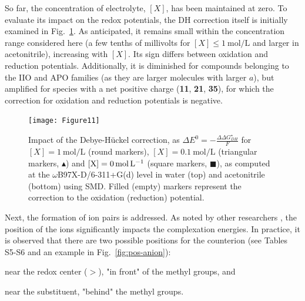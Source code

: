 \documentclass[review,preprint]{elsarticle}
\begin{document}
So far, the concentration of electrolyte, $[X]$, has been maintained at zero. To evaluate its impact on the redox potentials, the DH correction itself is initially examined in Fig.~\ref{fig:DH}. As anticipated, it remains small within the concentration range considered here (a few tenths of millivolts for $[X] \leq \SI{1}{\mole\per\liter}$ and larger in acetonitrile), increasing with $[X]$. Its sign differs between oxidation and reduction potentials. Additionally, it is diminished for compounds belonging to the IIO and APO families (as they are larger molecules with larger $a$), but amplified for species with a net positive charge (\textbf{11}, \textbf{21}, \textbf{35}), for which the correction for oxidation and reduction potentials is negative.


\begin{figure}[!b]
	\centering
	\texttt{[image: Figure11]}
	\caption{Impact of the Debye-Hückel correction, as $\Delta E^0 = -\frac{\Delta \Delta G_{DH}^\star}{F}$ for $[X]=\SI{1}{\mole\per\liter}$ (round markers), $[X]=\SI{0.1}{\mole\per\liter}$ (triangular markers, $\blacktriangle$)  and $[\ce{X}]=\SI{0}{\mole\per\liter}$ (square markers, $\blacksquare$), as computed at the $\omega$B97X-D/6-311+G(d) level in water (top) and acetonitrile (bottom) using SMD. Filled (empty) markers represent the correction to the oxidation (reduction) potential. }
	\label{fig:DH}
\end{figure}

\clearpage

Next, the formation of ion pairs is addressed. As noted by other researchers \cite{zhangInteractionsImidazoliumBasedIonic2016,wylieImprovedPerformanceAllOrganic2019a}, the position of the ions significantly impacts the complexation energies. In practice, it is observed that there are two possible positions for the counterion (see Tables S5-S6 and an example in Fig.~\ref{fig:pos-anion}):
\begin{inparaenum}[(i)]
	\item near the redox center ($>$), "in front" of the methyl groups, and
	\item near the substituent, "behind" the methyl groups.
\end{inparaenum}
\end{document}
